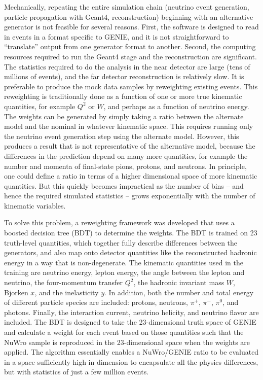 \documentclass[11pt]{article}
\begin{document}
Mechanically, repeating the entire simulation chain (neutrino event generation, particle propagation with Geant4, reconstruction) beginning with an alternative generator is not feasible for several reasons. First, the software is designed to read in events in a format specific to GENIE, and it is not straightforward to ``translate'' output from one generator format to another. Second, the computing resources required to run the Geant4 stage and the reconstruction are significant. The statistics required to do the analysis in the near detector are large (tens of millions of events), and the far detector reconstruction is relatively slow. It is preferable to produce the mock data samples by reweighting existing events. This reweighting is traditionally done as a function of one or more true kinematic quantities, for example $Q^{2}$ or $W$, and perhaps as a function of neutrino energy. The weights can be generated by simply taking a ratio between the alternate model and the nominal in whatever kinematic space. This requires running only the neutrino event generation step using the alternate model. However, this produces a result that is not representative of the alternative model, because the differences in the prediction depend on many more quantities, for example the number and momenta of final-state pions, protons, and neutrons. In principle, one could define a ratio in terms of a higher dimensional space of more kinematic quantities. But this quickly becomes impractical as the number of bins -- and hence the required simulated statistics -- grows exponentially with the number of kinematic variables.

To solve this problem, a reweighting framework was developed that uses a boosted decision tree (BDT) to determine the weights. The BDT is trained on 23 truth-level quantities, which together fully describe differences between the generators, and also map onto detector quantities like the reconstructed hadronic energy in a way that is non-degenerate. The kinematic quantities used in the training are neutrino energy, lepton energy, the angle between the lepton and neutrino, the four-momentum transfer $Q^{2}$, the hadronic invariant mass $W$, Bjorken $x$, and the inelasticity $y$. In addition, both the number and total energy of different particle species are included: protons, neutrons, $\pi^{+}$, $\pi^{-}$, $\pi^{0}$, and photons. Finally, the interaction current, neutrino helicity, and neutrino flavor are included. The BDT is designed to take the 23-dimensional truth space of GENIE and calculate a weight for each event based on those quantities such that the NuWro sample is reproduced in the 23-dimensional space when the weights are applied. The algorithm essentially enables a NuWro/GENIE ratio to be evaluated in a space sufficiently high in dimension to encapsulate all the physics differences, but with statistics of just a few million events.
\end{document}
